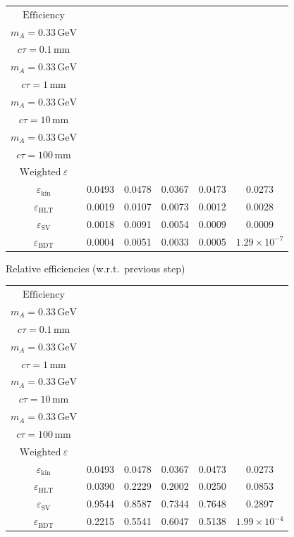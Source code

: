 \documentclass[10pt,a4paper]{article}
\begin{document}
{\begin{tabular}{cccccc}
\toprule
$\mathrm{Efficiency}$ & \shortstack{$m_{\pi}=1\,\mathrm{GeV}$\\$m_{A}=0.33\,\mathrm{GeV}$\\$c\tau=0.1\,\mathrm{mm}$} & \shortstack{$m_{\pi}=1\,\mathrm{GeV}$\\$m_{A}=0.33\,\mathrm{GeV}$\\$c\tau=1\,\mathrm{mm}$} & \shortstack{$m_{\pi}=1\,\mathrm{GeV}$\\$m_{A}=0.33\,\mathrm{GeV}$\\$c\tau=10\,\mathrm{mm}$} & \shortstack{$m_{\pi}=1\,\mathrm{GeV}$\\$m_{A}=0.33\,\mathrm{GeV}$\\$c\tau=100\,\mathrm{mm}$} & \shortstack{$\mathrm{QCD}$\\$\mathrm{Weighted}\ \varepsilon$} \\
\midrule
$\varepsilon_{\mathrm{kin}}$ & 0.0493 & 0.0478 & 0.0367 & 0.0473 & 0.0273\\
$\varepsilon_{\mathrm{HLT}}$ & 0.0019 & 0.0107 & 0.0073 & 0.0012 & 0.0028\\
$\varepsilon_{\mathrm{SV}}$ & 0.0018 & 0.0091 & 0.0054 & 0.0009 & 0.0009\\
$\varepsilon_{\mathrm{BDT}}$ & 0.0004 & 0.0051 & 0.0033 & 0.0005 & $1.29\times10^{-7}$\\
\bottomrule
\end{tabular}

\vspace{18pt}

Relative efficiencies (w.r.t.\ previous step)

\begin{tabular}{cccccc}
\toprule
$\mathrm{Efficiency}$ & \shortstack{$m_{\pi}=1\,\mathrm{GeV}$\\$m_{A}=0.33\,\mathrm{GeV}$\\$c\tau=0.1\,\mathrm{mm}$} & \shortstack{$m_{\pi}=1\,\mathrm{GeV}$\\$m_{A}=0.33\,\mathrm{GeV}$\\$c\tau=1\,\mathrm{mm}$} & \shortstack{$m_{\pi}=1\,\mathrm{GeV}$\\$m_{A}=0.33\,\mathrm{GeV}$\\$c\tau=10\,\mathrm{mm}$} & \shortstack{$m_{\pi}=1\,\mathrm{GeV}$\\$m_{A}=0.33\,\mathrm{GeV}$\\$c\tau=100\,\mathrm{mm}$} & \shortstack{$\mathrm{QCD}$\\$\mathrm{Weighted}\ \varepsilon$} \\
\midrule
$\varepsilon_{\mathrm{kin}}$ & 0.0493 & 0.0478 & 0.0367 & 0.0473 & 0.0273\\
$\varepsilon_{\mathrm{HLT}}$ & 0.0390 & 0.2229 & 0.2002 & 0.0250 & 0.0853\\
$\varepsilon_{\mathrm{SV}}$ & 0.9544 & 0.8587 & 0.7344 & 0.7648 & 0.2897\\
$\varepsilon_{\mathrm{BDT}}$ & 0.2215 & 0.5541 & 0.6047 & 0.5138 & $1.99\times10^{-4}$\\
\bottomrule
\end{tabular}

}
\end{document}
